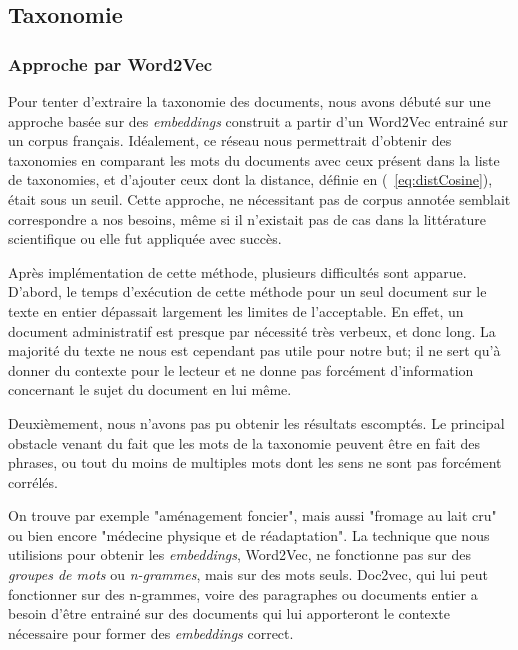 
\subsection{Taxonomie}%
\subsubsection{Approche par Word2Vec}\label{word2vecReal}
Pour tenter d'extraire la taxonomie des documents, nous avons débuté sur une approche basée sur des \textit{embeddings} construit a partir d'un Word2Vec entrainé sur un corpus français. Idéalement, ce réseau nous permettrait d'obtenir des taxonomies en comparant les mots du documents avec ceux présent dans la liste de taxonomies, et d'ajouter ceux dont la distance, définie en (~\ref{eq:distCosine}), était sous un seuil. Cette approche, ne nécessitant pas de corpus annotée semblait correspondre a nos besoins, même si il n'existait pas de cas dans la littérature scientifique ou elle fut appliquée avec succès. %

Après implémentation de cette méthode, plusieurs difficultés sont apparue.
D'abord, le temps d'exécution de cette méthode pour un seul document sur le texte en entier dépassait largement les limites de l'acceptable.
En effet, un document administratif est presque par nécessité très verbeux, et donc long. La majorité du texte ne nous est cependant pas utile pour notre but; 
il ne sert qu'à donner du contexte pour le lecteur et ne donne pas forcément d'information concernant le sujet du document en lui même. 

Deuxièmement, nous n'avons pas pu obtenir les résultats escomptés. Le principal obstacle venant du fait que les mots de la taxonomie peuvent être en fait des phrases, ou tout du moins de multiples mots dont les sens ne sont pas forcément corrélés.

On trouve par exemple "aménagement foncier", mais aussi "fromage au lait cru" ou bien encore "médecine physique et de réadaptation". La technique que nous utilisions pour obtenir les \textit{embeddings}, Word2Vec, ne fonctionne pas sur des \textit{groupes de mots} ou \textit{n-grammes}, mais sur des mots seuls. Doc2vec, qui lui peut fonctionner sur des n-grammes, voire des paragraphes ou documents entier a besoin d'être entrainé sur des documents qui lui apporteront le contexte nécessaire pour former des \textit{embeddings} correct.


